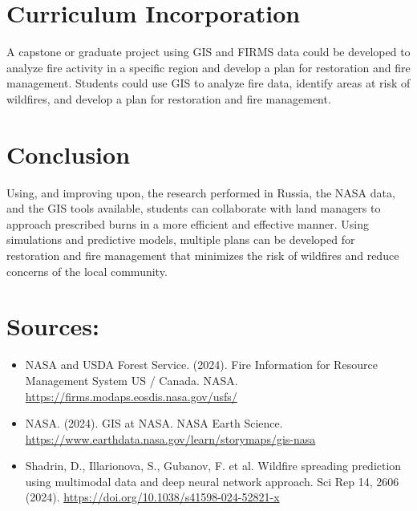\documentclass{article}
\begin{document}
\section*{Curriculum Incorporation}

A capstone or graduate project using GIS and FIRMS data could be developed to analyze fire activity in a specific region and develop a plan for restoration and fire management. Students could use GIS to analyze fire data, identify areas at risk of wildfires, and develop a plan for restoration and fire management.\vspace{5mm}

\section*{Conclusion}

Using, and improving upon, the research performed in Russia, the NASA data, and the GIS tools available, students can collaborate with land managers to approach prescribed burns in a more efficient and effective manner. Using simulations and predictive models, multiple plans can be developed for restoration and fire management that minimizes the risk of wildfires and reduce concerns of the local community.\vspace{5mm}

\newpage

\section*{Sources:}

\small
\begin{itemize}
    \sloppy
    \item NASA and USDA Forest Service. (2024). Fire Information for Resource Management System US / Canada. NASA.
    \url{https://firms.modaps.eosdis.nasa.gov/usfs/}
    \item NASA. (2024). GIS at NASA. NASA Earth Science.
    \url{https://www.earthdata.nasa.gov/learn/storymaps/gis-nasa} 
    \item Shadrin, D., Illarionova, S., Gubanov, F. et al. Wildfire spreading prediction using multimodal data and deep neural network approach. Sci Rep 14, 2606 (2024).
    \url{https://doi.org/10.1038/s41598-024-52821-x} 
\end{itemize}
\end{document}
